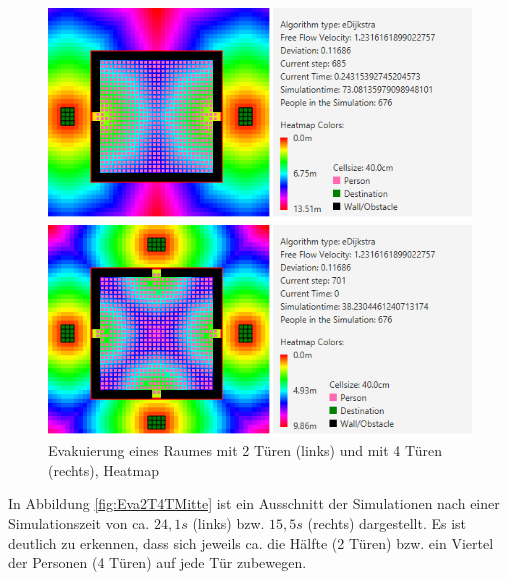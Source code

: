 \begin{figure}[!htb]
	\centering
	\begin{minipage}{.5\textwidth}
		\centering
		\includegraphics[width=\textwidth]{abbildungen/Evak2TuerenAnfangHeat.png}
	\end{minipage}%
	\begin{minipage}{0.5\textwidth}
		\centering
		\includegraphics[width=\textwidth]{abbildungen/Evak4TuerenAnfangHeat.png}
	\end{minipage}
		\caption{Evakuierung eines Raumes mit 2 Türen (links) und mit 4 Türen (rechts), Heatmap}
		\label{fig:Eva2T4THeatMap}
\end{figure}

In Abbildung \ref{fig:Eva2T4TMitte} ist ein Ausschnitt der Simulationen nach einer Simulationszeit von ca. $24,1s$ (links) bzw. $15,5s$ (rechts) dargestellt. Es ist deutlich zu erkennen, dass sich jeweils ca. die Hälfte (2 Türen) bzw. ein Viertel der Personen (4 Türen) auf jede Tür zubewegen. 

